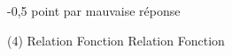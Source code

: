 %
%
    -0,5 point par mauvaise réponse
    \begin{tasks}(4)
        \task Relation
        \task Fonction
        \task Relation
        \task Fonction
    \end{tasks}
